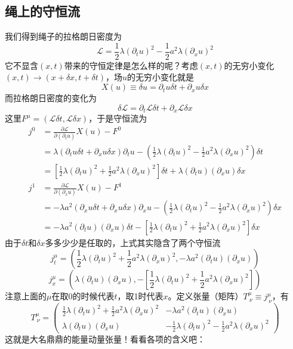 \documentclass[a4paper,11pt]{ctexart}
\newcommand{\beq}{\begin{equation}}
\newcommand{\eeq}{\end{equation}}
\newcommand{\bea}{\begin{equation}\begin{aligned}}
\newcommand{\eea}{\end{aligned}\end{equation}}
\newcommand{\red}{\color{red}}
\newcommand{\lag}{\mathcal{L}}
\begin{document}
\subsection{绳上的守恒流}
我们得到绳子的拉格朗日密度为
\beq
\lag = \frac{1}{2} \lambda (\partial_t u)^2 - \frac{1}{2} a^2 \lambda (\partial_x u)^2
\eeq
它不显含$(x,t)$带来的守恒定律是怎么样的呢？考虑$(x,t)$的无穷小变化$(x,t) \to (x + \delta x,t + \delta t)$，场$u$的无穷小变化就是
\beq
X(u) \equiv \delta u = \partial_t u \delta t + \partial_x u \delta x
\eeq
而拉格朗日密度的变化为
\beq
\delta \lag = \partial_t \lag \delta t + \partial_x \lag \delta x
\eeq
这里$F^\mu = (\lag \delta t, \lag \delta x)$，于是守恒流为
\bea
j^0 &= \frac{\partial \lag}{\partial (\partial_t u)} X(u) - F^0 \\
&= \lambda (\partial_t u \delta t + \partial_x u \delta x) \partial_t u - (\frac{1}{2} \lambda (\partial_t u)^2 - \frac{1}{2} a^2 \lambda (\partial_x u)^2) \delta t \\
&=[\frac{1}{2} \lambda (\partial_t u)^2 + \frac{1}{2} a^2 \lambda (\partial_x u)^2] \delta t + \lambda (\partial_t u)(\partial_x u) \delta x \\
j^1 &= \frac{\partial \lag}{\partial (\partial_x u)} X(u) - F^1 \\
&= -\lambda a^2 (\partial_x u \delta t + \partial_x u \delta x) \partial_x u - (\frac{1}{2} \lambda (\partial_t u)^2 - \frac{1}{2} a^2 \lambda (\partial_x u)^2) \delta x \\
&= - \lambda a^2 (\partial_t u)(\partial_x u) \delta t -[\frac{1}{2} \lambda (\partial_t u)^2 + \frac{1}{2} a^2 \lambda (\partial_x u)^2] \delta x 
\eea
由于$\delta t$和$\delta x$多多少少是任取的，上式其实隐含了两个守恒流
\beq
j^\mu_t = (\frac{1}{2} \lambda (\partial_t u)^2 + \frac{1}{2} a^2 \lambda (\partial_x u)^2, - \lambda a^2 (\partial_t u)(\partial_x u))
\eeq
\beq
j^\mu_x = (\lambda (\partial_t u)(\partial_x u), -[\frac{1}{2} \lambda (\partial_t u)^2 + \frac{1}{2} a^2 \lambda (\partial_x u)^2])
\eeq
注意上面的$\mu$在取0的时候代表$t$，取1时代表$x$。定义张量（矩阵）$T^\mu_{\ \nu} \equiv j^\mu_{\ \nu}$，有
\beq
T^\mu_{\ \nu} = 
\begin{pmatrix}
\frac{1}{2} \lambda (\partial_t u)^2 + \frac{1}{2} a^2 \lambda (\partial_x u)^2 & - \lambda a^2 (\partial_t u)(\partial_x u) \\
\lambda (\partial_t u)(\partial_x u) & -\frac{1}{2} \lambda (\partial_t u)^2 - \frac{1}{2} a^2 \lambda (\partial_x u)^2
\end{pmatrix}
\eeq
这就是大名鼎鼎的{\red 能量动量张量}！看看各项的含义吧：
\end{document}

